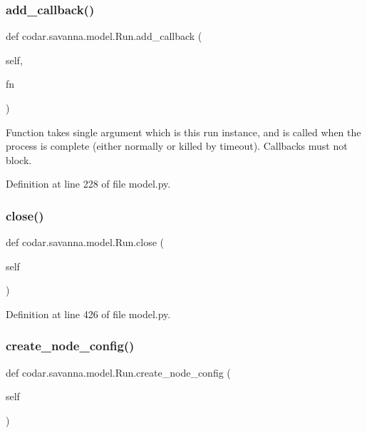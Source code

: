 \subsubsection{\texorpdfstring{add\+\_\+callback()}{add\_callback()}}
{\footnotesize\ttfamily def codar.\+savanna.\+model.\+Run.\+add\+\_\+callback (\begin{DoxyParamCaption}\item[{}]{self,  }\item[{}]{fn }\end{DoxyParamCaption})}

\begin{DoxyVerb}Function takes single argument which is this run instance, and is
called when the process is complete (either normally or killed by
timeout). Callbacks must not block.\end{DoxyVerb}
 

Definition at line 228 of file model.\+py.

\mbox{\label{classcodar_1_1savanna_1_1model_1_1_run_a079f9410453bd7459a8d0acdc891c6cf}} 
\subsubsection{\texorpdfstring{close()}{close()}}
{\footnotesize\ttfamily def codar.\+savanna.\+model.\+Run.\+close (\begin{DoxyParamCaption}\item[{}]{self }\end{DoxyParamCaption})}



Definition at line 426 of file model.\+py.

\mbox{\label{classcodar_1_1savanna_1_1model_1_1_run_a1c7234a57ae8bcb81fdec643f3825b31}} 
\subsubsection{\texorpdfstring{create\+\_\+node\+\_\+config()}{create\_node\_config()}}
{\footnotesize\ttfamily def codar.\+savanna.\+model.\+Run.\+create\+\_\+node\+\_\+config (\begin{DoxyParamCaption}\item[{}]{self }\end{DoxyParamCaption})}



